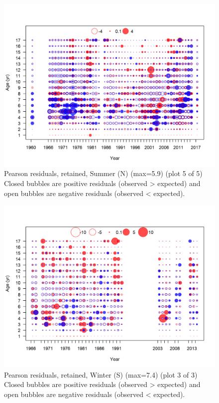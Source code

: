 \documentclass[12pt,]{article}
\begin{document}
\begin{figure}
\centering
\includegraphics{r4ss/plots_mod1/comp_agefit_residsflt2mkt2_page5.png}
\caption{Pearson residuals, retained, Summer (N) (max=5.9) (plot 5 of
5)\\
Closed bubbles are positive residuals (observed \textgreater{} expected)
and open bubbles are negative residuals (observed \textless{} expected).
\label{fig:sn_age_pearson}}
\end{figure}

\begin{figure}
\centering
\includegraphics{r4ss/plots_mod1/comp_agefit_residsflt3mkt2_page3.png}
\caption{Pearson residuals, retained, Winter (S) (max=7.4) (plot 3 of
3)\\
Closed bubbles are positive residuals (observed \textgreater{} expected)
and open bubbles are negative residuals (observed \textless{} expected).
\label{fig:ws_age_pearson}}
\end{figure}
\end{document}
